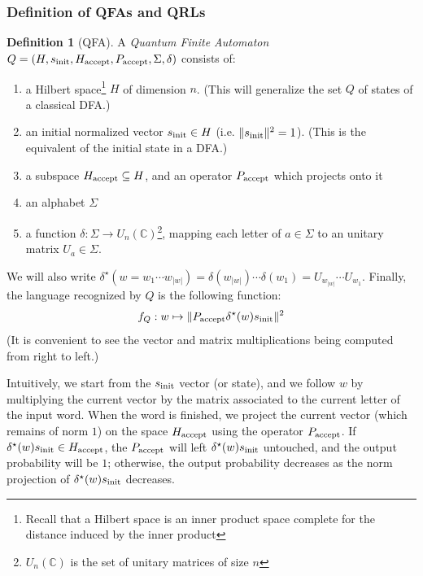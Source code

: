 \documentclass[12pt,a4paper]{article}
\theoremstyle{definition}
\newtheorem*{definition}{Definition}
\begin{document}
\subsubsection{Definition of QFAs and QRLs}
\begin{definition}[QFA]
    A \emph{Quantum Finite Automaton} $Q=(H, s_{\textnormal{init}}, H_{\textnormal{accept}}, P_{\textnormal{accept}}, \Sigma, \delta)$ consists of:
    \begin{enumerate}[label=--, noitemsep]
        \item a Hilbert space\footnote{Recall that a Hilbert space is an inner product space complete for the distance induced by the inner product} $H$ of dimension $n$. (This will generalize the set $Q$ of states of a classical DFA.)
        \item an initial normalized vector $s_{\textnormal{init}}\in H$ (i.e. $\|s_{\textnormal{init}}\|^2=1$). (This is the equivalent of the initial state in a DFA.)
        \item a subspace $H_{\textnormal{accept}} \subseteq H$, and an operator $P_{\textnormal{accept}}$ which projects onto it
        \item an alphabet $\Sigma$
        \item a function $\delta : \Sigma \to U_n(\mathbb{C})$\footnote{$U_n(\mathbb{C})$ is the set of unitary matrices of size $n$}, mapping each letter of $a\in\Sigma$ to an unitary matrix $U_a\in\Sigma$.
    \end{enumerate}
    
    We will also write $\delta^\star(w=w_1\cdots w_{|w|}) = \delta(w_{|w|})\cdots \delta(w_1) = U_{w_{|w|}}\cdots U_{w_1}$. Finally, the language recognized by $Q$ is the following function:
    \begin{equation*}
        f_Q : w \mapsto \|P_{\textnormal{accept}}\delta^\star(w)s_{\textnormal{init}}\|^2
    \end{equation*}
    (It is convenient to see the vector and matrix multiplications being computed from right to left.)
\end{definition}

Intuitively, we start from the $s_{\textnormal{init}}$ vector (or state), and we follow $w$ by multiplying the current vector by the matrix associated to the current letter of the input word. When the word is finished, we project the current vector (which remains of norm $1$) on the space $H_{\textnormal{accept}}$ using the operator $P_{\textnormal{accept}}$. If $\delta^\star(w)s_{\textnormal{init}}\in H_{\textnormal{accept}}$, the $P_{\textnormal{accept}}$ will left $\delta^\star(w)s_{\textnormal{init}}$ untouched, and the output probability will be $1$; otherwise, the output probability decreases as the norm projection of $\delta^\star(w)s_{\textnormal{init}}$ decreases.
\end{document}
